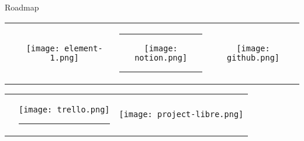 \begin{frame}[c]{Roadmap}
    \begin{tabular}{cccc}
        \rule{30pt}{0ex}  &   \texttt{[image: element-1.png]} & \rule{15pt}{0ex} \texttt{[image: notion.png]} \rule{15pt}{0ex}& \texttt{[image: github.png]}\\
    \end{tabular}

    \begin{tabular}{ccc}
        \phantom{This text s invisible} &   \texttt{[image: trello.png]} \rule{5pt}{0ex}& \texttt{[image: project-libre.png]} \\
    \end{tabular}
\end{frame}
